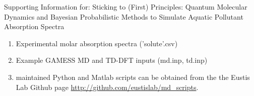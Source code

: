 \documentclass{article}
\begin{document}
Supporting Information for: Sticking to (First) Principles: Quantum Molecular Dynamics and Bayesian Probabilistic Methods to Simulate Aquatic Pollutant Absorption Spectra

\begin{enumerate}
\item Experimental molar absorption spectra ('solute'.csv)
\item Example GAMESS MD and TD-DFT inputs (md.inp, td.inp)
\item maintained Python and Matlab scripts can be obtained from the the Eustis Lab Github page \url{http://github.com/eustislab/md_scripts}.
\end{enumerate}
\end{document}
